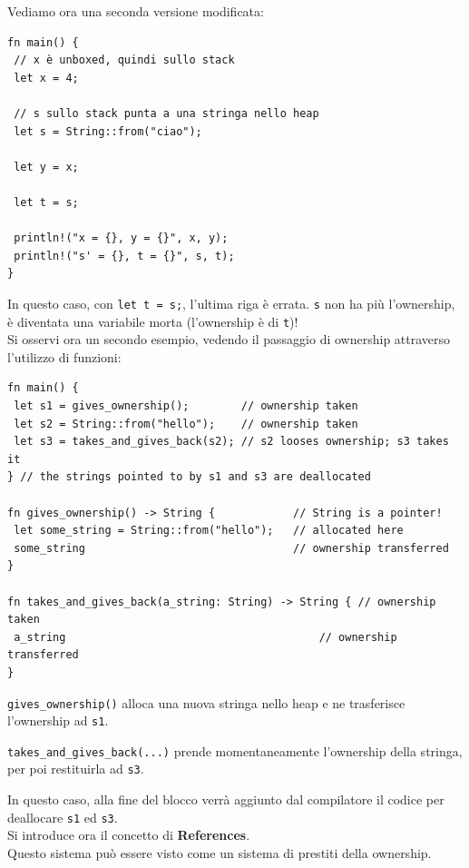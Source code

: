 \documentclass{article}
\begin{document}
Vediamo ora una seconda versione modificata:
\begin{tcolorbox}
\begin{verbatim}
fn main() {
 // x è unboxed, quindi sullo stack
 let x = 4; 

 // s sullo stack punta a una stringa nello heap
 let s = String::from("ciao"); 

 let y = x;

 let t = s;

 println!("x = {}, y = {}", x, y);
 println!("s' = {}, t = {}", s, t);
}
\end{verbatim}
\end{tcolorbox}
In questo caso, con \texttt{let t = s;}, l'ultima riga è errata. \texttt{s} non ha più l'ownership, è diventata una variabile morta (l'ownership è di \texttt{t})!\vspace{14pt}\\
Si osservi ora un secondo esempio, vedendo il passaggio di ownership attraverso l'utilizzo di funzioni:
\begin{tcolorbox}
\begin{verbatim}
fn main() {
 let s1 = gives_ownership();        // ownership taken
 let s2 = String::from("hello");    // ownership taken
 let s3 = takes_and_gives_back(s2); // s2 looses ownership; s3 takes it
} // the strings pointed to by s1 and s3 are deallocated

fn gives_ownership() -> String {            // String is a pointer!
 let some_string = String::from("hello");   // allocated here
 some_string                                // ownership transferred
}

fn takes_and_gives_back(a_string: String) -> String { // ownership taken
 a_string                                       // ownership transferred
}
\end{verbatim}
\end{tcolorbox}
\texttt{gives\_ownership()} alloca una nuova stringa nello heap e ne trasferisce l'ownership ad \texttt{s1}.

\texttt{takes\_and\_gives\_back(...)} prende momentaneamente l'ownership della stringa, per poi restituirla ad \texttt{s3}.

In questo caso, alla fine del blocco verrà aggiunto dal compilatore il codice per deallocare \texttt{s1} ed \texttt{s3}.\vspace{14pt}\\
Si introduce ora il concetto di \textbf{References}.\\
Questo sistema può essere visto come un sistema di prestiti della ownership.
\end{document}

